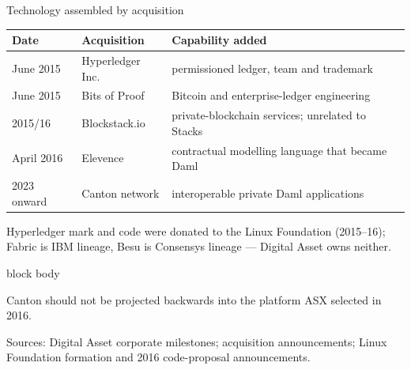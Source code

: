 \documentclass[aspectratio=169,12pt]{beamer}
\newcommand{\muted}[1]{\textcolor{Quiet}{#1}}
\newcommand{\source}[1]{\vfill\par\fontsize{5.4}{6.5}\selectfont\color{Quiet}Sources: #1}
\newenvironment{statement}{%
  \begin{beamercolorbox}[sep=.18cm,rounded=false,wd=\linewidth]{block body}%
  \fontsize{13}{15.5}\selectfont\bfseries
}{\end{beamercolorbox}}
\begin{document}
\begin{frame}{Technology assembled by acquisition}
  \fontsize{9.9}{11.8}\selectfont
  \begin{tabularx}{\textwidth}{L{1.55cm}L{2.55cm}Y}
    \toprule
    \textbf{Date} & \textbf{Acquisition} & \textbf{Capability added} \\
    \midrule
    June 2015 & Hyperledger Inc. & permissioned ledger, team and trademark \\
    June 2015 & Bits of Proof & Bitcoin and enterprise-ledger engineering \\
    2015/16 & Blockstack.io & private-blockchain services; unrelated to Stacks \\
    April 2016 & Elevence & contractual modelling language that became Daml \\
    2023 onward & Canton network & interoperable private Daml applications \\
    \bottomrule
  \end{tabularx}
  \vspace{0.14cm}
  \muted{\fontsize{9.0}{10.8}\selectfont Hyperledger mark and code were donated to the Linux Foundation (2015--16); Fabric is IBM lineage, Besu is Consensys lineage --- Digital Asset owns neither.}
  \vspace{0.10cm}
  \begin{statement}
    Canton should not be projected backwards into the platform ASX selected in 2016.
  \end{statement}
  \source{Digital Asset corporate milestones; acquisition announcements; Linux Foundation formation and 2016 code-proposal announcements.}
\end{frame}
\end{document}
